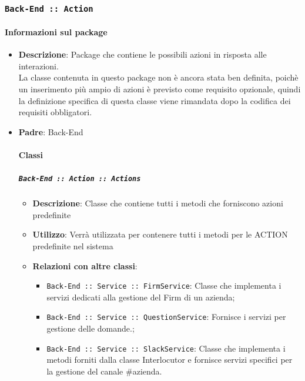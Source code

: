 \documentclass[../DefinizioneDiProdotto.tex]{subfiles}
\begin{document}
	\newpage
	\subsubsection{ \texttt{Back-End :: Action}}
	\paragraph{Informazioni sul package}


	\begin{itemize}\item \textbf{Descrizione}: Package che contiene le possibili azioni in risposta alle interazioni.\\
	La classe contenuta in questo package non è ancora stata ben definita, poichè un inserimento più ampio di azioni è previsto come requisito opzionale, quindi la definizione specifica di questa classe viene rimandata dopo la codifica dei requisiti obbligatori.  \item \textbf{Padre}: Back-End\paragraph{Classi}
	\subparagraph{\texttt{Back-End :: Action :: Actions}}
	\begin{itemize}\item \textbf{Descrizione}: Classe che contiene tutti i metodi che forniscono azioni predefinite
	\item \textbf{Utilizzo}: Verrà utilizzata per contenere tutti i metodi per le ACTION predefinite nel sistema
	\item \textbf{Relazioni con altre classi}:
	\begin{itemize}
	\item \texttt{Back-End :: Service :: FirmService}: Classe che implementa i servizi dedicati alla gestione del Firm di un azienda;
	\item \texttt{Back-End :: Service :: QuestionService}: Fornisce i servizi per gestione delle domande.;
	\item \texttt{Back-End :: Service :: SlackService}: Classe che implementa i metodi forniti dalla classe Interlocutor e fornisce servizi specifici per la gestione del canale \#azienda.
	\end{itemize}
	\end{itemize}\end{itemize}

	\newpage
\end{document}
